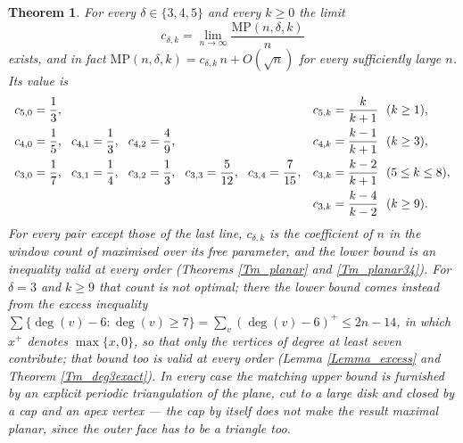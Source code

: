 \documentclass[12pt,a4paper]{article}%
\newtheorem{theorem}{Theorem}
\begin{document}
\begin{theorem}
\label{Tm_intro}For every $\delta \in \{3,4,5\}$ and every $k\geq 0$ the limit
\[
c_{\delta ,k}=\lim_{n\rightarrow \infty }\frac{\mathrm{MP}(n,\delta ,k)}{n}
\]
exists, and in fact $\mathrm{MP}(n,\delta ,k)=c_{\delta ,k}\,n+O(\sqrt{n})$ for every sufficiently large
$n$. Its value is
\[
\begin{array}
[c]{ll}%
c_{5,0}=\dfrac{1}{3}, & c_{5,k}=\dfrac{k}{k+1}\ \ (k\geq 1),\\[3mm]
c_{4,0}=\dfrac{1}{5},\ \ c_{4,1}=\dfrac{1}{3},\ \ c_{4,2}=\dfrac{4}{9}, & c_{4,k}=\dfrac{k-1}{k+1}\ \
(k\geq 3),\\[3mm]
c_{3,0}=\dfrac{1}{7},\ \ c_{3,1}=\dfrac{1}{4},\ \ c_{3,2}=\dfrac{1}{3},\ \ c_{3,3}=\dfrac{5}{12},\ \
c_{3,4}=\dfrac{7}{15}, & c_{3,k}=\dfrac{k-2}{k+1}\ \ (5\leq k\leq 8),\\[3mm]
& c_{3,k}=\dfrac{k-4}{k-2}\ \ (k\geq 9).
\end{array}
\]
For every pair except those of the last line, $c_{\delta ,k}$ is the coefficient of $n$ in the window
count of \cite{P1} maximised over its free parameter, and the lower bound is an inequality valid at
every order (Theorems \ref{Tm_planar} and \ref{Tm_planar34}). For $\delta =3$ and $k\geq 9$ that count
is not optimal; there the lower bound comes instead from the excess inequality
$\sum \{\deg (v)-6:\deg (v)\geq 7\}=\sum_{v}(\deg (v)-6)^{+}\leq 2n-14$, in which $x^{+}$ denotes
$\max \{x,0\}$, so that only the vertices of degree at least seven contribute; that bound too is valid at
every order (Lemma \ref{Lemma_excess} and Theorem \ref{Tm_deg3exact}). In every case the matching upper
bound is furnished by an explicit periodic triangulation of the plane, cut to a large disk and closed by a
cap and an apex vertex --- the cap by itself does not make the result maximal planar, since the outer face
has to be a triangle too.
\end{theorem}

\end{document}

